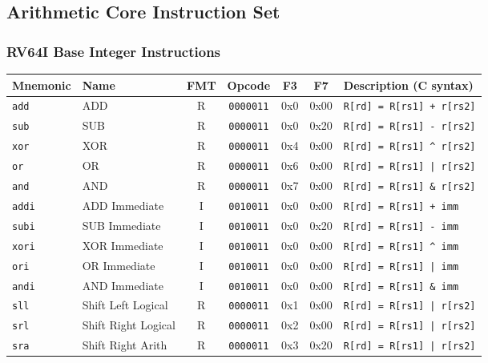 \documentclass{article}
\newcommand{\code}[1]{\texttt{#1}}
\begin{document}
\subsection*{Arithmetic Core Instruction Set}

\subsubsection*{RV64I Base Integer Instructions}

\begin{tabular}
{l | l | c | c | c | c | l }
Mnemonic    & Name                  & FMT & Opcode        & F3  & F7    & Description (C syntax)  \\ \hline
\code{add}  & ADD                   & R  & \code{0000011} & 0x0 & 0x00  & \code{R[rd] = R[rs1] + r[rs2]} \\
\code{sub}  & SUB                   & R  & \code{0000011} & 0x0 & 0x20  & \code{R[rd] = R[rs1] - r[rs2]} \\
\code{xor}  & XOR                   & R  & \code{0000011} & 0x4 & 0x00  & \code{R[rd] = R[rs1] \^{} r[rs2]} \\
\code{or}   & OR                    & R  & \code{0000011} & 0x6 & 0x00  & \code{R[rd] = R[rs1] | r[rs2]} \\
\code{and}  & AND                   & R  & \code{0000011} & 0x7 & 0x00  & \code{R[rd] = R[rs1] \& r[rs2]} \\ \hline

\code{addi} & ADD Immediate         & I  & \code{0010011} & 0x0 & 0x00  & \code{R[rd] = R[rs1] + imm} \\
\code{subi} & SUB Immediate         & I  & \code{0010011} & 0x0 & 0x20  & \code{R[rd] = R[rs1] - imm} \\
\code{xori} & XOR Immediate         & I  & \code{0010011} & 0x0 & 0x00  & \code{R[rd] = R[rs1] \^{} imm} \\
\code{ori}  & OR Immediate          & I  & \code{0010011} & 0x0 & 0x00  & \code{R[rd] = R[rs1] | imm} \\
\code{andi} & AND Immediate         & I  & \code{0010011} & 0x0 & 0x00  & \code{R[rd] = R[rs1] \& imm} \\ \hline

\code{sll}  & Shift Left Logical    & R  & \code{0000011} & 0x1 & 0x00  & \code{R[rd] = R[rs1] | r[rs2]} \\
\code{srl}  & Shift Right Logical   & R  & \code{0000011} & 0x2 & 0x00  & \code{R[rd] = R[rs1] | r[rs2]} \\
\code{sra}  & Shift Right Arith     & R  & \code{0000011} & 0x3 & 0x20  & \code{R[rd] = R[rs1] | r[rs2]} \\ \hline


\end{tabular}
\end{document}
